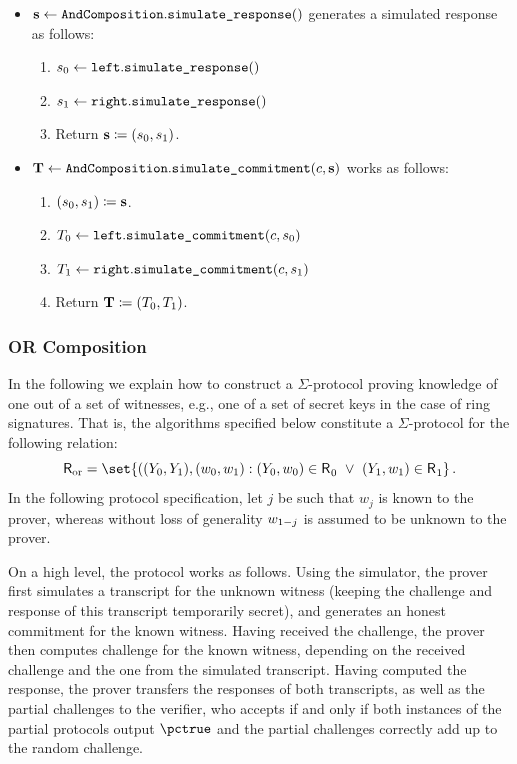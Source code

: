 \documentclass[11pt]{article}
\begin{document}
\begin{itemize}
  \item
  $\mathbf {s} \gets \texttt{AndComposition}.\texttt{simulate\_response}()$
   generates a simulated response as follows:
    \begin{enumerate}
      \item
        $s_0\gets\texttt{left}.\texttt{simulate\_response}()$
        \item $s_1\gets\texttt{right}.\texttt{simulate\_response}()$
      \item
        Return $\mathbf {s}\coloneqq(s_0,s_1)$.
    \end{enumerate}
  \item
  $\mathbf {T} \gets \texttt{AndComposition}.\texttt{simulate\_commitment}(c, \mathbf {s})$ works as follows:
    \begin{enumerate}
      \item
        $(s_0,s_1)\coloneqq\mathbf{s}$.
      \item
        $T_0\gets\texttt{left}.\texttt{simulate\_commitment}(c,s_0)$
        \item $T_1\gets\texttt{right}.\texttt{simulate\_commitment}(c,s_1)$
      \item
        Return $\mathbf {T}\coloneqq(T_0, T_1)$.
      \end{enumerate}
\end{itemize}



\subsubsection{OR Composition}

  In the following we explain how to construct a $\Sigma$-protocol proving knowledge of one out of a set of witnesses, e.g., one of a set of secret keys in the case of ring signatures.
  That is, the algorithms specified below constitute a $\Sigma$-protocol for the following relation:
\[
  \relation[or] = \set{
    ((\statement_0,\statement_1),(\witness_0,\witness_1) :
    (\statement_0,\witness_0)\in \relation_0 ~\lor~ (\statement_1,\witness_1)\in\relation_1}\,.
\]
  In the following protocol specification, let $j$ be such that $w_j$ is known to the prover, whereas without loss of generality $w_{1-j}$ is assumed to be unknown to the prover.

	On a high level, the protocol works as follows.
	Using the simulator, the prover first simulates a transcript for the unknown witness (keeping the challenge and response of this transcript temporarily secret), and generates an honest commitment for the known witness.
	Having received the challenge, the prover then computes challenge for the known witness, depending on the received challenge and the one from the simulated transcript.
	Having computed the response, the prover transfers the responses of both transcripts, as well as the partial challenges to the verifier, who accepts if and only if both instances of the partial protocols output $\accept$ and the partial challenges correctly add up to the random challenge.
\end{document}
